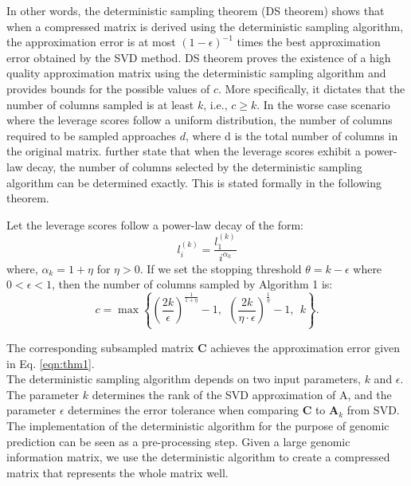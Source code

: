 In other words, the deterministic sampling theorem (DS theorem) shows that when a compressed matrix is derived using the deterministic sampling algorithm, the approximation error is at most $(1-\epsilon)^{-1}$ times the best approximation error obtained by the SVD method. DS theorem proves the existence of a high quality approximation matrix using the deterministic sampling algorithm and provides bounds for the possible values of $c$. More specifically, it dictates that the number of columns sampled is at least $k$, i.e., $c \geq k$. In the worse case scenario where the leverage scores follow a uniform distribution, the number of columns required to be sampled approaches $d$, where d is the total number of columns in the original matrix. \cite{papailiopoulos_provable_2014} further state that when the leverage scores exhibit a power-law decay, the number of columns selected by the deterministic sampling algorithm can be determined exactly. This is stated formally in the following theorem. 


\begin{theorem}
Let the leverage scores follow a power-law decay of the form:
\begin{equation}
\label{eqn:powerlaw}
l_i^{(k)} = \frac{l_1^{(k)}}{i^{\alpha_k}}
\end{equation}
where, $\alpha_k = 1+\eta$ for $\eta >0$. If we set the stopping threshold $\theta = k-\epsilon$ where $0<\epsilon<1$,  then the number of columns sampled by Algorithm 1 is:
\begin{equation}
c = \max \left\{\left( \frac{2k}{\epsilon} \right)^{\frac{1}{1+\eta}}-1, \ \ \left( \frac{2k}{\eta \cdot \epsilon} \right)^{\frac{1}{\eta}}-1,\ \  k \right\}.
\end{equation}

\end{theorem}

The corresponding subsampled matrix $\textbf{C}$ achieves the approximation error given in Eq. \ref{eqn:thm1}. \\

The deterministic sampling algorithm depends on two input parameters, $k$ and $\epsilon$. The parameter $k$ determines the rank of the SVD approximation of A, and the parameter $\epsilon$ determines the error tolerance when comparing $\textbf{C}$ to $\textbf{A}_k$ from SVD. The implementation of the deterministic algorithm for the purpose of genomic prediction can be seen as a pre-processing step. Given a large genomic information matrix, we use the deterministic algorithm to create a compressed matrix that represents the whole matrix well. \\

